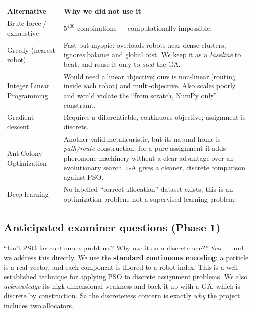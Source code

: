 \documentclass[11pt]{article}
\begin{document}
\begin{center}
\renewcommand{\arraystretch}{1.35}
\begin{tabular}{@{}p{3.6cm} p{9.4cm}@{}}
\toprule
\textbf{Alternative} & \textbf{Why we did not use it} \\
\midrule
Brute force / exhaustive & $5^{400}$ combinations --- computationally impossible. \\
Greedy (nearest robot) & Fast but myopic: overloads robots near dense clusters, ignores balance and global cost. We keep it as a \emph{baseline} to beat, and reuse it only to \emph{seed} the GA. \\
Integer Linear Programming & Would need a linear objective; ours is non-linear (routing inside each robot) and multi-objective. Also scales poorly and would violate the ``from scratch, NumPy only'' constraint. \\
Gradient descent & Requires a differentiable, continuous objective; assignment is discrete. \\
Ant Colony Optimization & Another valid metaheuristic, but its natural home is \emph{path/route} construction; for a pure assignment it adds pheromone machinery without a clear advantage over an evolutionary search. GA gives a cleaner, discrete comparison against PSO. \\
Deep learning & No labelled ``correct allocation'' dataset exists; this is an optimization problem, not a supervised-learning problem. \\
\bottomrule
\end{tabular}
\end{center}

\subsection{Anticipated examiner questions (Phase 1)}

\begin{qbox}{``Isn't PSO for continuous problems? Why use it on a discrete one?''}
Yes --- and we address this directly. We use the \textbf{standard continuous
encoding}: a particle is a real vector, and each component is floored to a robot
index. This is a well-established technique for applying PSO to discrete
assignment problems. We also \emph{acknowledge} its high-dimensional weakness and
back it up with a GA, which is discrete by construction. So the discreteness
concern is exactly \emph{why} the project includes two allocators.
\end{qbox}
\end{document}
